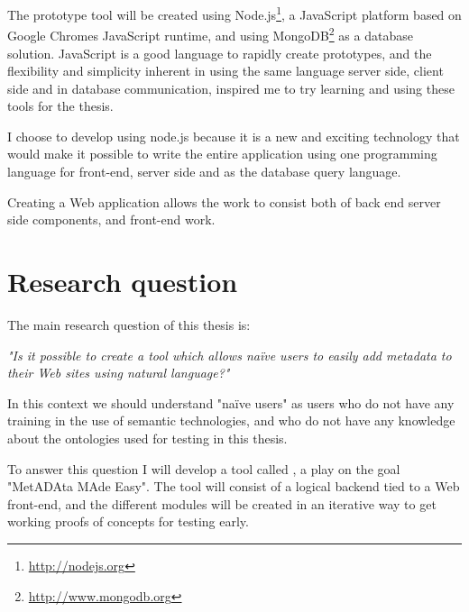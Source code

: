 The prototype tool will be created using Node.js\footnote{\url{http://nodejs.org}},
a JavaScript platform based on Google Chromes JavaScript runtime,
and using MongoDB\footnote{\url{http://www.mongodb.org}} as a database solution.
JavaScript is a good language to rapidly create prototypes, and the flexibility and simplicity inherent in using the same language
server side, client side and in database communication, inspired me to try learning and using these tools for the thesis.

%

I choose to develop using node.js because it is a new and exciting technology that would make it possible to write
the entire application using one programming language for front-end, server side and as the database query language.

Creating a Web application allows the work to consist both of back end server side components, and front-end work.


\section{Research question}
The main research question of this thesis is:

\emph{"Is it possible to create a tool which allows naïve users to easily add metadata to their Web sites using natural language?"}

In this context we should understand "naïve users" as users who do not have any training in the use of semantic technologies,
and who do not have any knowledge about the ontologies used for testing in this thesis.

To answer this question I will develop a tool called \theartefact, a play on the goal "MetADAta MAde Easy".
The tool will consist of a logical backend tied to a Web front-end,
and the different modules will be created in an iterative way to get working proofs of concepts for testing early.

